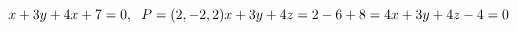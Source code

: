 \subsection{}
\begin{math}
    x+3y+4x+7=0,
    \hspace{6px}
    P=(2,-2,2)
    \\
    x+3y+4z
    =2-6+8
    =4
    \\
    x+3y+4z-4=0
\end{math}